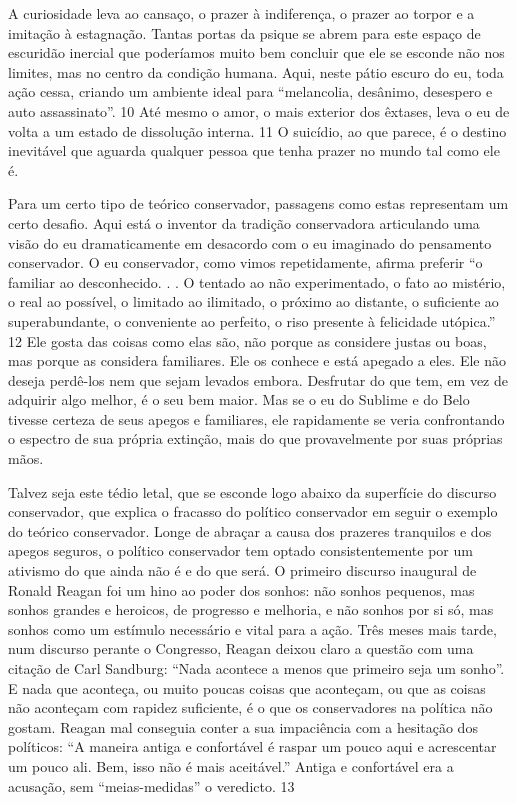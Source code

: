  
\par
 
A curiosidade leva ao cansaço, o prazer à indiferença, o prazer ao torpor e a imitação à estagnação. Tantas portas da psique se abrem para este espaço de escuridão inercial que poderíamos muito bem concluir que ele se esconde não nos limites, mas no centro da condição humana. Aqui, neste pátio escuro do eu, toda ação cessa, criando um ambiente ideal para “melancolia, desânimo, desespero e auto assassinato”.
 {\color{blue} 10}  
Até mesmo o amor, o mais exterior dos êxtases, leva o eu de volta a um estado de dissolução interna.
 {\color{blue} 11}  
O suicídio, ao que parece, é o destino inevitável que aguarda qualquer pessoa que tenha prazer no mundo tal como ele é.
 
\par
 
Para um certo tipo de teórico conservador, passagens como estas representam um certo desafio. Aqui está o inventor da tradição conservadora articulando uma visão do eu dramaticamente em desacordo com o eu imaginado do pensamento conservador. O eu conservador, como vimos repetidamente, afirma preferir “o familiar ao desconhecido. . . O tentado ao não experimentado, o fato ao mistério, o real ao possível, o limitado ao ilimitado, o próximo ao distante, o suficiente ao superabundante, o conveniente ao perfeito, o riso presente à felicidade utópica.”
 {\color{blue} 12}  
Ele gosta das coisas como elas são, não porque as considere justas ou boas, mas porque as considera familiares. Ele os conhece e está apegado a eles. Ele não deseja perdê-los nem que sejam levados embora. Desfrutar do que tem, em vez de adquirir algo melhor, é o seu bem maior. Mas se o eu do Sublime e do Belo tivesse certeza de seus apegos e familiares, ele rapidamente se veria confrontando o espectro de sua própria extinção, mais do que provavelmente por suas próprias mãos.
 
\par
 
Talvez seja este tédio letal, que se esconde logo abaixo da superfície do discurso conservador, que explica o fracasso do político conservador em seguir o exemplo do teórico conservador. Longe de abraçar a causa dos prazeres tranquilos e dos apegos seguros, o político conservador tem optado consistentemente por um ativismo do que ainda não é e do que será. O primeiro discurso inaugural de Ronald Reagan foi um hino ao poder dos sonhos: não sonhos pequenos, mas sonhos grandes e heroicos, de progresso e melhoria, e não sonhos por si só, mas sonhos como um estímulo necessário e vital para a ação. Três meses mais tarde, num discurso perante o Congresso, Reagan deixou claro a questão com uma citação de Carl Sandburg: “Nada acontece a menos que primeiro seja um sonho”. E nada que aconteça, ou muito poucas coisas que aconteçam, ou que as coisas não aconteçam com rapidez suficiente, é o que os conservadores na política não gostam. Reagan mal conseguia conter a sua impaciência com a hesitação dos políticos: “A maneira antiga e confortável é raspar um pouco aqui e acrescentar um pouco ali. Bem, isso não é mais aceitável.” Antiga e confortável era a acusação, sem “meias-medidas” o veredicto.
 {\color{blue} 13}  

